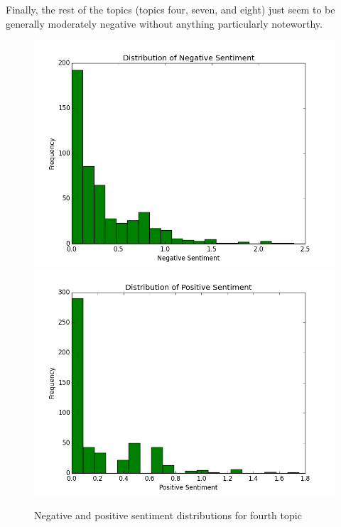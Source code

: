 \documentclass{article}
\begin{document}
\begin{enumerate}
		Finally, the rest of the topics (topics four, seven, and eight) just seem to be generally moderately negative without anything particularly noteworthy.
		\begin{figure}[H]
			\includegraphics[scale=0.35]{3neg.png}
			\includegraphics[scale=0.35]{3pos.png}
			\begin{center}
			\caption{Negative and positive sentiment distributions for fourth topic}
			\end{center}
		\end{figure}
		

\end{enumerate}
\end{document}
